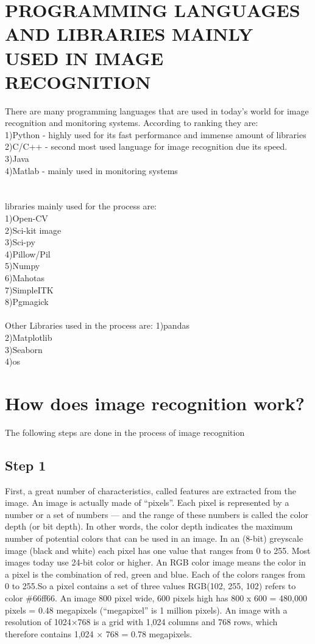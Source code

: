 \documentclass[12pt,letterpaper, onecolumn]{exam}
\begin{document}
  \section{PROGRAMMING LANGUAGES AND LIBRARIES MAINLY USED IN IMAGE RECOGNITION}
  There are many programming languages that are used in today's world for image recognition and monitoring systems. According to ranking they are:\\
  1)Python - highly used for its fast performance and immense amount of libraries\\
  2)C/C++ - second most used language for image recognition due its speed.\\
  3)Java \\
  4)Matlab - mainly used in monitoring systems\\
  \\\\
  libraries mainly used for the process are:\\
  1)Open-CV\\
  2)Sci-kit image\\
  3)Sci-py\\
  4)Pillow/Pil\\
  5)Numpy\\
  6)Mahotas\\
  7)SimpleITK\\
  8)Pgmagick\\
  \\
  Other Libraries used in the process are:
  1)pandas\\
  2)Matplotlib\\
  3)Seaborn\\
  4)os
  
  \section{How does image recognition work?}
    The following steps are done in the process of image recognition
    \subsection{Step 1}
        First, a great number of characteristics, called features are extracted from the image. An image is actually made of “pixels”.
        Each pixel is represented by a number or a set of numbers — and the range of these numbers is called the color depth (or bit depth). In other words, the color depth indicates the maximum number of potential colors that can be used in an image. In an (8-bit) greyscale image (black and white) each pixel has one value that ranges from 0 to 255. Most images today use 24-bit color or higher. An RGB color image means the color in a pixel is the combination of red, green and blue. Each of the colors ranges from 0 to 255.So a pixel contains a set of three values RGB(102, 255, 102) refers to color \#66ff66. An image 800 pixel wide, 600 pixels high has 800 x 600 = 480,000 pixels = 0.48 megapixels (“megapixel” is 1 million pixels). An image with a resolution of 1024×768 is a grid with 1,024 columns and 768 rows, which therefore contains 1,024 × 768 = 0.78 megapixels.
        
\end{document}
